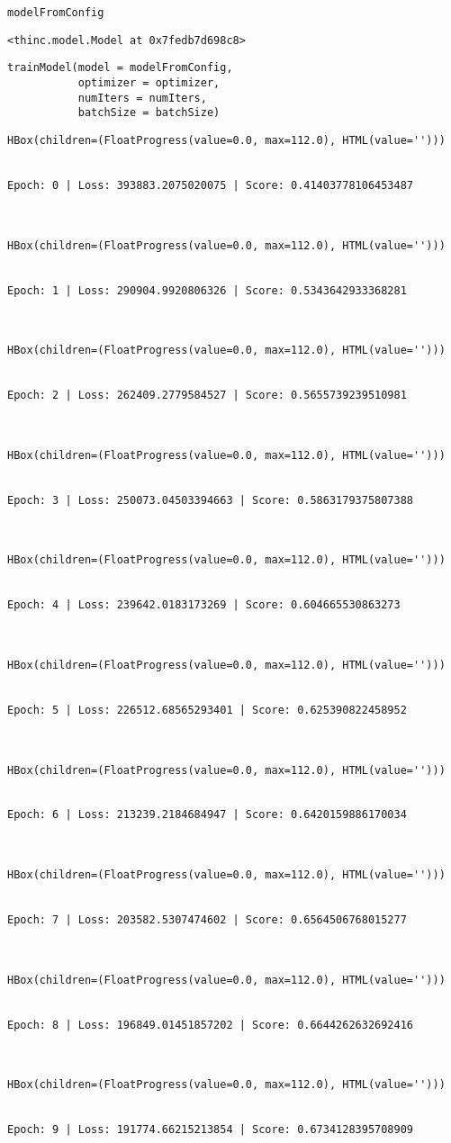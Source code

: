 \documentclass[
]{article}
\begin{document}
\begin{verbatim}
modelFromConfig
\end{verbatim}

\begin{verbatim}
<thinc.model.Model at 0x7fedb7d698c8>
\end{verbatim}

\begin{verbatim}
trainModel(model = modelFromConfig,
           optimizer = optimizer,
           numIters = numIters,
           batchSize = batchSize)
\end{verbatim}

\begin{verbatim}
HBox(children=(FloatProgress(value=0.0, max=112.0), HTML(value='')))


Epoch: 0 | Loss: 393883.2075020075 | Score: 0.41403778106453487



HBox(children=(FloatProgress(value=0.0, max=112.0), HTML(value='')))


Epoch: 1 | Loss: 290904.9920806326 | Score: 0.5343642933368281



HBox(children=(FloatProgress(value=0.0, max=112.0), HTML(value='')))


Epoch: 2 | Loss: 262409.2779584527 | Score: 0.5655739239510981



HBox(children=(FloatProgress(value=0.0, max=112.0), HTML(value='')))


Epoch: 3 | Loss: 250073.04503394663 | Score: 0.5863179375807388



HBox(children=(FloatProgress(value=0.0, max=112.0), HTML(value='')))


Epoch: 4 | Loss: 239642.0183173269 | Score: 0.604665530863273



HBox(children=(FloatProgress(value=0.0, max=112.0), HTML(value='')))


Epoch: 5 | Loss: 226512.68565293401 | Score: 0.625390822458952



HBox(children=(FloatProgress(value=0.0, max=112.0), HTML(value='')))


Epoch: 6 | Loss: 213239.2184684947 | Score: 0.6420159886170034



HBox(children=(FloatProgress(value=0.0, max=112.0), HTML(value='')))


Epoch: 7 | Loss: 203582.5307474602 | Score: 0.6564506768015277



HBox(children=(FloatProgress(value=0.0, max=112.0), HTML(value='')))


Epoch: 8 | Loss: 196849.01451857202 | Score: 0.6644262632692416



HBox(children=(FloatProgress(value=0.0, max=112.0), HTML(value='')))


Epoch: 9 | Loss: 191774.66215213854 | Score: 0.6734128395708909
\end{verbatim}
\end{document}
